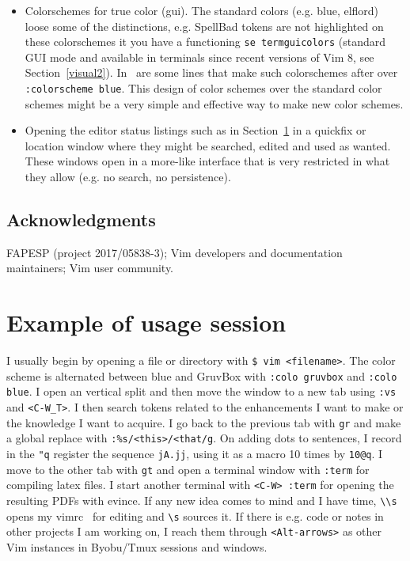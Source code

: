\documentclass{article}
\newcommand{\ttt}[1] {
	\texttt{<#1>}}
\newcommand{\tttt}[1]{\texttt{#1}}
\begin{document}
\begin{itemize}
      \item Colorschemes for true color (gui).
        The standard colors (e.g. blue, elflord) loose some of the distinctions,
        e.g. SpellBad tokens are not highlighted on these colorschemes
        it you have a functioning \tttt{se termguicolors} (standard GUI mode
        and available in terminals since recent versions of Vim 8, see Section~\ref{visual2}). In~\cite{vimrc} are some lines that make such colorschemes after over
        \tttt{:colorscheme blue}.
        This design of color schemes over the standard color schemes might be
        a very simple and effective way to make new color schemes.
      \item Opening the editor status listings such as in Section~\ref{}
        in a quickfix or location window where they might be searched, edited
        and used as wanted.
        These windows open in a more-like interface that is very restricted in what
        they allow (e.g. no search, no persistence).
    \end{itemize}

\subsection*{Acknowledgments}
FAPESP (project 2017/05838-3); Vim developers and documentation maintainers;
Vim user community. 

\appendix
\section{Example of usage session}
I usually begin by opening a file or directory
with \tttt{\$ vim <filename>}.
The color scheme is alternated between
blue and GruvBox with
\tttt{:colo gruvbox} and \tttt{:colo blue}.
I open an vertical split and then move
the window to a new tab using
\tttt{:vs} and \ttt{C-W\_T}.
I then search tokens related to
the enhancements I want to make or
the knowledge I want to acquire.
I go back to the previous tab with \tttt{gr}
and make a global replace with
\tttt{:\%s/<this>/<that/g}.
On adding dots to sentences,
I record in the \tttt{"q} register
the sequence \tttt{jA.jj},
using it as a macro 10 times by
\tttt{10@q}.
I move to the other tab with \tttt{gt}
and open a terminal window with \tttt{:term}
for compiling latex files.
I start another terminal with \tttt{<C-W> :term}
for opening the resulting PDFs with evince.
If any new idea comes to mind and I have time,
\tttt{\textbackslash\textbackslash s} opens 
my vimrc~\cite{vimrc} for editing and \tttt{\textbackslash s}
sources it.
If there is e.g. code or notes in other projects I am working
on, I reach them through \tttt{<Alt-arrows>} as other Vim instances
in Byobu/Tmux sessions and windows.
\end{document}
